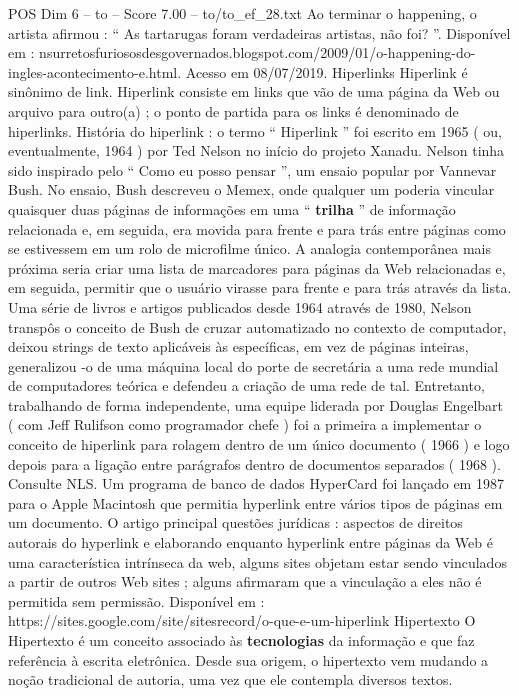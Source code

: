 \begin{textsample}{POS Dim 6 – to – Score 7.00 – to/to\_ef\_28.txt}
Ao terminar o happening, o artista afirmou : “ As tartarugas foram verdadeiras artistas, não foi? ”.
Disponível em : nsurretosfuriososdesgovernados.blogspot.com/2009/01/o-happening-do-ingles-acontecimento-e.html.
Acesso em 08/07/2019.
Hiperlinks Hiperlink é sinônimo de link.
Hiperlink consiste em links que vão de uma página da Web ou arquivo para outro(a) ; o ponto de partida para os links é denominado de hiperlinks.
História do hiperlink : o termo “ Hiperlink ” foi escrito em 1965 ( ou, eventualmente, 1964 ) por Ted Nelson no início do projeto Xanadu.
Nelson tinha sido inspirado pelo “ Como eu posso pensar ”, um ensaio popular por Vannevar Bush.
No ensaio, Bush descreveu o Memex, onde qualquer um poderia vincular quaisquer duas páginas de informações em uma “ \textbf{trilha} ” de informação relacionada e, em seguida, era movida para frente e para trás entre páginas como se estivessem em um rolo de microfilme único.
A analogia contemporânea mais próxima seria criar uma lista de marcadores para páginas da Web relacionadas e, em seguida, permitir que o usuário virasse para frente e para trás através da lista.
Uma série de livros e artigos publicados desde 1964 através de 1980, Nelson transpôs o conceito de Bush de cruzar automatizado no contexto de computador, deixou strings de texto aplicáveis às específicas, em vez de páginas inteiras, generalizou -o de uma máquina local do porte de secretária a uma rede mundial de computadores teórica e defendeu a criação de uma rede de tal.
Entretanto, trabalhando de forma independente, uma equipe liderada por Douglas Engelbart ( com Jeff Rulifson como programador chefe ) foi a primeira a implementar o conceito de hiperlink para rolagem dentro de um único documento ( 1966 ) e logo depois para a ligação entre parágrafos dentro de documentos separados ( 1968 ).
Consulte NLS.
Um programa de banco de dados HyperCard foi lançado em 1987 para o Apple Macintosh que permitia hyperlink entre vários tipos de páginas em um documento.
O artigo principal questões jurídicas : aspectos de direitos autorais do hyperlink e elaborando enquanto hyperlink entre páginas da Web é uma característica intrínseca da web, alguns sites objetam estar sendo vinculados a partir de outros Web sites ; alguns afirmaram que a vinculação a eles não é permitida sem permissão.
Disponível em : https://sites.google.com/site/sitesrecord/o-que-e-um-hiperlink Hipertexto O Hipertexto é um conceito associado às \textbf{tecnologias} da informação e que faz referência à escrita eletrônica.
Desde sua origem, o hipertexto vem mudando a noção tradicional de autoria, uma vez que ele contempla diversos textos.

\end{textsample}
